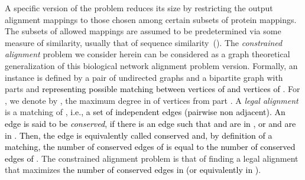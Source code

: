 \documentclass[final]{dmtcs-episciences}
\newcommand\mar[1]{\textcolor{black}{#1}}
\begin{document}
A specific version of the problem
reduces its size by restricting the output alignment mappings to those 
chosen among certain subsets of protein mappings. The subsets of allowed mappings are assumed 
to be predetermined via some measure of similarity, usually that of sequence similarity~(\citet{AbakaBE13,ZaslavskiyBV09}). 
The  \emph{ constrained alignment} problem we consider herein can be considered as a graph theoretical generalization 
of this biological network alignment problem version. 
Formally, an instance  is defined by  a pair of undirected graphs  and a bipartite graph  with parts  and  \mar{representing possible matching between vertices of  and vertices of }. For , we denote by , the maximum degree in  of vertices from part .  
A  \emph{ legal alignment}  is a matching of , \mar{i.e., a set of independent edges (pairwise non adjacent). An edge   is said to be {\em conserved}, if there is an edge  such that  and  are in , or  and  are in . Then, the edge  is equivalently called conserved and, by definition of a matching, the number of conserved edges of  is equal to the number of conserved edges of }.
The constrained alignment problem is that of finding a legal alignment that 
maximizes \mar{the number of conserved edges in  (or equivalently in )}. 
\end{document}
